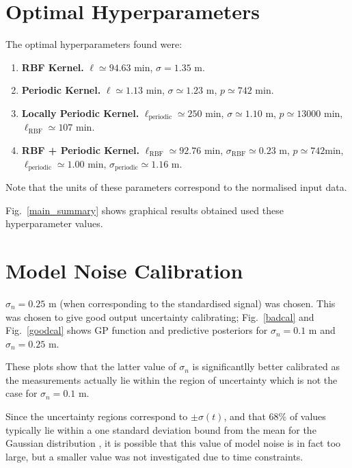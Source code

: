 \documentclass[a4paper, twocolumn, 10pt]{article}
\begin{document}
\begin{appendices}
	
\section{Optimal Hyperparameters}
\label{sec_opt_hyps}
The optimal hyperparameters found were:
\begin{enumerate}
	\item \textbf{RBF Kernel.} $\ell \simeq 94.63 \text{ min}$, $\sigma = 1.35 \text{ m}$.
	\item \textbf{Periodic Kernel.} $\ell \simeq 1.13 \text{ min}$, $\sigma \simeq 1.23 \text{ m}$, $p \simeq 742 \text{ min}$. 
	\item \textbf{Locally Periodic Kernel.} $\ell_\text{periodic} \simeq 250 \text{ min}$, $\sigma \simeq 1.10 \text{ m}$, $p \simeq 13000 \text{ min}$,  $\ell_\text{RBF} \simeq 107 \text{ min}$.   
	\item \textbf{RBF + Periodic Kernel.} $\ell_\text{RBF} \simeq 92.76 \text{ min}$, $\sigma_\text{RBF} \simeq 0.23 \text{ m}$, $p \simeq 742 \text{min}$, $\ell_\text{periodic} \simeq 1.00 \text{ min}$, $ \sigma_\text{periodic} \simeq 1.16 \text{ m}$.
\end{enumerate}

Note that the units of these parameters correspond to the normalised input data. 

Fig.~\ref{main_summary} shows graphical results obtained used these hyperparameter values. 

\section{Model Noise Calibration}
\label{sec_model_noise}
$\sigma_n = 0.25 \text{ m}$ (when corresponding to the standardised signal) was chosen. This was chosen to give good output uncertainty calibrating; Fig.~\ref{badcal} and Fig.~\ref{goodcal} shows GP function and predictive posteriors for $\sigma_n=0.1 \text{ m}$ and $\sigma_n =0.25 \text{ m}$.  

These plots show that the latter value of $\sigma_n$ is significantlly better calibrated as the measurements actually lie within the region of uncertainty which is not the case for $\sigma_n = 0.1 \text{ m}$. 

Since the uncertainty regions correspond to $\pm \sigma(t)$, and that $68\%$ of values typically lie within a one standard deviation bound from the mean for the Gaussian distribution \citep{wiki}, it is possible that this value of model noise is in fact too large, but a smaller value was not investigated due to time constraints. 


\end{appendices}
\end{document}
